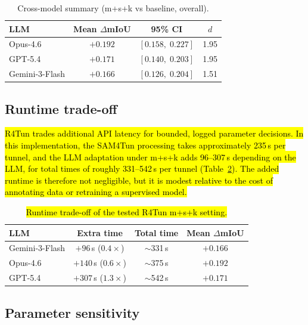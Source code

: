 \documentclass[a4paper,fleqn]{cas-dc}
\begin{document}
{\begin{table}[ht]
\caption{Cross-model summary (m+s+k vs baseline, overall).}\label{tab:cross-model}
\begin{tabular*}{\tblwidth}{@{} l c c c @{}}
\toprule
LLM & Mean $\Delta$mIoU & 95\% CI & \mbox{$d$} \\
\midrule
Opus-4.6 & $+0.192$ & $[0.158,\; 0.227]$ & 1.95 \\
GPT-5.4 & $+0.171$ & $[0.140,\; 0.203]$ & 1.95 \\
Gemini-3-Flash & $+0.166$ & $[0.126,\; 0.204]$ & 1.51 \\
\bottomrule
\end{tabular*}
\end{table}

\subsection{Runtime trade-off}\label{sec:runtime-tradeoff}

\hl{R4Tun trades additional API latency for bounded, logged parameter decisions. In this implementation, the SAM4Tun processing takes approximately 235\,s per tunnel, and the LLM adaptation under m+s+k adds 96--307\,s depending on the LLM, for total times of roughly 331--542\,s per tunnel (Table~\ref{tab:runtime-tradeoff}). The added runtime is therefore not negligible, but it is modest relative to the cost of annotating data or retraining a supervised model.}

\begin{table}[ht]
\caption{\hl{Runtime trade-off of the tested R4Tun m+s+k setting.}}\label{tab:runtime-tradeoff}
\begin{tabular*}{\tblwidth}{@{} l c c c @{}}
\toprule
LLM & Extra time & Total time & Mean $\Delta$mIoU \\
\midrule
Gemini-3-Flash & $+96$\,s ($0.4\times$) & $\sim$331\,s & $+0.166$ \\
Opus-4.6 & $+140$\,s ($0.6\times$) & $\sim$375\,s & $+0.192$ \\
GPT-5.4 & $+307$\,s ($1.3\times$) & $\sim$542\,s & $+0.171$ \\
\bottomrule
\end{tabular*}
\end{table}

\subsection{Parameter sensitivity}\label{sec:sensitivity}

}
\end{document}
